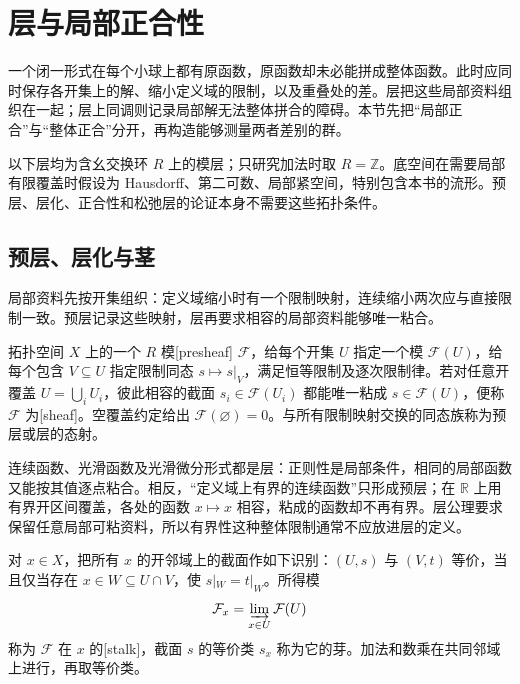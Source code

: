 
% 
% 

\section{层与局部正合性}
\label{g2:sec:0701}

一个闭一形式在每个小球上都有原函数，原函数却未必能拼成整体函数。此时应同时保存各开集上的解、缩小定义域的限制，以及重叠处的差。层把这些局部资料组织在一起；层上同调则记录局部解无法整体拼合的障碍。本节先把“局部正合”与“整体正合”分开，再构造能够测量两者差别的群。

以下层均为含幺交换环 \(R\) 上的模层；只研究加法时取 \(R=\mathbb Z\)。底空间在需要局部有限覆盖时假设为 Hausdorff、第二可数、局部紧空间，特别包含本书的流形。预层、层化、正合性和松弛层的论证本身不需要这些拓扑条件。

\subsection{预层、层化与茎}
\label{g2:subsec:0701:01}
局部资料先按开集组织：定义域缩小时有一个限制映射，连续缩小两次应与直接限制一致。预层记录这些映射，层再要求相容的局部资料能够唯一粘合。

\begin{definition}\label{g2:def:presheaf-sheaf}
	拓扑空间 \(X\) 上的一个 \(R\) 模[presheaf] \(\mathcal F\)，给每个开集 \(U\) 指定一个模 \(\mathcal F(U)\)，给每个包含 \(V\subseteq U\) 指定限制同态 \(s\mapsto s|_V\)，满足恒等限制及逐次限制律。若对任意开覆盖 \(U=\bigcup_iU_i\)，彼此相容的截面 \(s_i\in\mathcal F(U_i)\) 都能唯一粘成 \(s\in\mathcal F(U)\)，便称 \(\mathcal F\) 为[sheaf]。空覆盖约定给出 \(\mathcal F(\varnothing)=0\)。与所有限制映射交换的同态族称为预层或层的态射。
\end{definition}

连续函数、光滑函数及光滑微分形式都是层：正则性是局部条件，相同的局部函数又能按其值逐点粘合。相反，“定义域上有界的连续函数”只形成预层；在 \(\mathbb R\) 上用有界开区间覆盖，各处的函数 \(x\mapsto x\) 相容，粘成的函数却不再有界。层公理要求保留任意局部可粘资料，所以有界性这种整体限制通常不应放进层的定义。

\begin{definition}\label{g2:def:stalk}
	对 \(x\in X\)，把所有 \(x\) 的开邻域上的截面作如下识别：\((U,s)\) 与 \((V,t)\) 等价，当且仅当存在 \(x\in W\subseteq U\cap V\)，使 \(s|_W=t|_W\)。所得模
	\[
		\mathcal F_x=\varinjlim_{x\in U}\mathcal F(U)
	\]
	称为 \(\mathcal F\) 在 \(x\) 的[stalk]，截面 \(s\) 的等价类 \(s_x\) 称为它的芽。加法和数乘在共同邻域上进行，再取等价类。
\end{definition}

